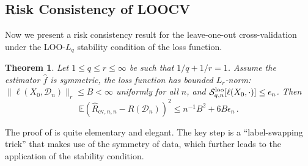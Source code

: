 \documentclass[11pt]{article}
\theoremstyle{plain}
\newtheorem{theorem}{Theorem}[section]
\newcommand{\cv}{{\mathrm{cv}}}
\newcommand{\D}{{\mathcal{D}}}
\renewcommand{\S}{{\mathcal{S}}}
\begin{document}
\subsection{Risk Consistency of LOOCV}\label{subsec:bousquet_consistency}
Now we present a risk consistency result for the leave-one-out cross-validation under the LOO-$L_q$ stability condition of the loss function.

\begin{theorem}\label{thm:bousquet-consistency}
Let $1\le q\le r\le \infty$ be such that $1/q+1/r=1$.
Assume the estimator $\hat f$ is symmetric, the loss function has bounded $L_r$-norm: $\|\ell(X_0,\D_n)\|_r\le B<\infty$ uniformly for all $n$, and
    $\S_{q,n}^{\rm loo}[\ell(X_0,\cdot)]\le \epsilon_n$. Then
$$\mathbb E(\hat R_{\cv,n,n}-R(\D_n))^2\le n^{-1}B^2+6 B \epsilon_n\,.$$
\end{theorem}

The proof of  is quite elementary and elegant. The key step is a ``label-swapping trick'' that makes use of the symmetry of data, which further leads to the application of the stability condition.
\end{document}
